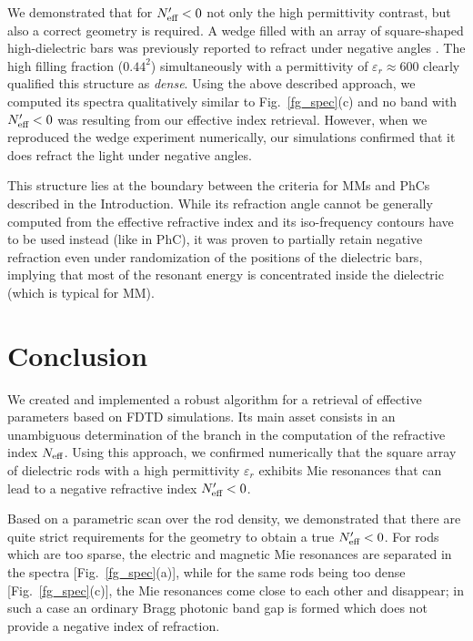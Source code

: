 \documentclass[letterpaper,12pt]{report}
\begin{document}
We demonstrated that for $N_{\text{eff} }'<0$ not only the high permittivity contrast, but also 
a correct geometry is required. A wedge filled
with an array of square-shaped high-dielectric bars was previously reported to refract
under negative angles \cite{peng2007}. The high filling fraction ($0.44^{2}$)
simultaneously with a permittivity of $\varepsilon_r \approx 600$ clearly qualified this
structure as \textit{dense}. Using the above described approach, we computed its spectra 
qualitatively similar to Fig.~\ref{fg_spec}(c) and no band with $N_{\text{eff} }' < 0$ was resulting from our effective index
retrieval. However, when we reproduced the wedge experiment numerically, our simulations
confirmed that it does refract the light under negative angles.

This structure lies at the boundary between the criteria for MMs and PhCs described in the Introduction.
While its refraction angle cannot be generally computed from the effective refractive index and
its iso-frequency contours have to be used instead (like in PhC), it was proven
\cite{peng2007} to partially retain negative refraction even under randomization of the positions
of the dielectric bars, implying that most of the resonant energy is concentrated inside
the dielectric (which is typical for MM).

\section{Conclusion}
We created and implemented a robust algorithm for a retrieval of effective parameters based on
FDTD simulations. Its main asset consists in an
unambiguous determination of the branch in the computation of the refractive index
$N_{\text{eff} }$. Using this approach, we confirmed numerically that the square array of
dielectric rods with a high permittivity $\varepsilon_r$ exhibits Mie resonances that can
lead to a negative refractive index $N_{\text{eff} }'<0$.

Based on a parametric scan over the rod density, we demonstrated that there are quite
strict requirements for the geometry to obtain a true $N_{\text{eff} }'<0$. For rods which are too
sparse, the electric and magnetic Mie resonances are separated in the spectra
[Fig.~\ref{fg_spec}(a)], while for the same rods being too dense [Fig.~\ref{fg_spec}(c)],
the Mie resonances come close to each other and disappear; in such a case an ordinary
Bragg photonic band gap is formed which does not provide a negative index of refraction.
\end{document}
